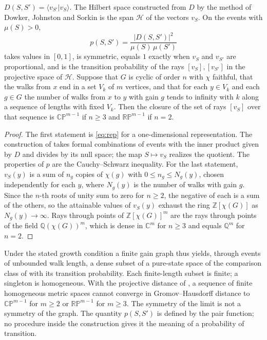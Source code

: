 \begin{proposition}\label{prop:hilbert}
$D(S,S')=\langle v_{S'}|v_S\rangle$. The Hilbert space constructed from $D$ by the method of Dowker, Johnston and Sorkin \cite{djs} is the span $\mathcal{H}$ of the vectors $v_S$. On the events with $\mu(S)>0$,
\[
p(S,S')=\frac{|D(S,S')|^2}{\mu(S)\,\mu(S')}
\]
takes values in $[0,1]$, is symmetric, equals $1$ exactly when $v_S$ and $v_{S'}$ are proportional, and is the transition probability of the rays $[v_S],[v_{S'}]$ in the projective space of $\mathcal{H}$. Suppose that $G$ is cyclic of order $n$ with $\chi$ faithful, that the walks from $x$ end in a set $V_k$ of $m$ vertices, and that for each $y\in V_k$ and each $g\in G$ the number of walks from $x$ to $y$ with gain $g$ tends to infinity with $k$ along a sequence of lengths with fixed $V_k$. Then the closure of the set of rays $[v_S]$ over that sequence is $\mathbb{CP}^{m-1}$ if $n\ge3$ and $\mathbb{RP}^{m-1}$ if $n=2$.
\end{proposition}
\begin{proof}
The first statement is \eqref{eq:rep} for a one-dimensional representation. The construction of \cite{djs} takes formal combinations of events with the inner product given by $D$ and divides by its null space; the map $S\mapsto v_S$ realizes the quotient. The properties of $p$ are the Cauchy--Schwarz inequality. For the last statement, $v_S(y)$ is a sum of $n_g$ copies of $\chi(g)$ with $0\le n_g\le N_g(y)$, chosen independently for each $y$, where $N_g(y)$ is the number of walks with gain $g$. Since the $n$-th roots of unity sum to zero for $n\ge2$, the negative of each is a sum of the others, so the attainable values of $v_S(y)$ exhaust the ring $\mathbb{Z}[\chi(G)]$ as $N_g(y)\to\infty$. Rays through points of $\mathbb{Z}[\chi(G)]^m$ are the rays through points of the field $\mathbb{Q}(\chi(G))^m$, which is dense in $\mathbb{C}^m$ for $n\ge3$ and equals $\mathbb{Q}^m$ for $n=2$.
\end{proof}

Under the stated growth condition a finite gain graph thus yields, through events of unbounded walk length, a dense subset of a pure-state space of the comparison class of \cite{g7} with its transition probability. Each finite-length subset is finite; a singleton is homogeneous. With the projective distance of \cite{g7}, a sequence of finite homogeneous metric spaces cannot converge in Gromov--Hausdorff distance to $\mathbb{CP}^{m-1}$ for $m\ge2$ or $\mathbb{RP}^{m-1}$ for $m\ge3$. The symmetry of the limit is not a symmetry of the graph. The quantity $p(S,S')$ is defined by the pair function; no procedure inside the construction gives it the meaning of a probability of transition.

